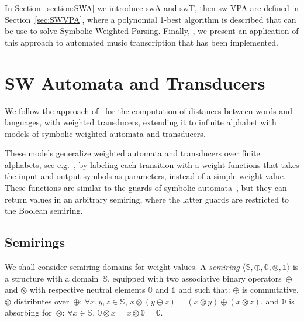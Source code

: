 \documentclass[runningheads]{llncs}
\def\<#1>{\langle #1 \rangle}
\newcommand{\Semiring}{\mathbb{S}}
\newcommand{\zero}{\mathbb{0}}
\newcommand{\one}{\mathbb{1}}
\def\SWT{\textsf{swT}\xspace}
\def\SWA{\textsf{swA}\xspace}
\def\SWVPA{\textsf{sw-VPA}\xspace}
\begin{document}

In Section~\ref{section:SWA} we introduce \SWA and \SWT, 
then \SWVPA are defined in Section~\ref{sec:SWVPA}, 
where a polynomial 1-best algorithm is described that can be use to solve
Symbolic Weighted Parsing.
Finally, \label{sec:transcription}, we present an application 
of this approach to automated music transcription that has been implemented.




\section{SW Automata and Transducers}
\label{section:transducer}
\label{section:SWA}
\label{section:SWT}

We follow the approach of~\cite{Mohri03EDWA} for the computation of distances
between words and languages, with weighted transducers, 
extending it to infinite alphabet with models of symbolic weighted automata 
and transducers. %

These models generalize weighted automata and transducers over finite alphabets, 
see  e.g.~\cite{Mohri03EDWA}, 
by labeling each transition with a weight functions that takes the 
input and output symbols as parameters, instead of a simple weight value.
These functions are similar to the guards of symbolic automata~\cite{dAntoniVeanes17CAV,dAntoni21CACM},
but they can return values in an arbitrary semiring, 
where the latter guards are restricted to the Boolean semiring.


\subsection{Semirings}
\label{section:semiring}
We shall consider semiring domains for weight values.
%
A \emph{semiring} $\< \Semiring, \oplus, \zero, \otimes, \one>$ 
is a structure with a domain~$\Semiring$,
equipped with two associative
binary operators~$\oplus$ and $\otimes$
with respective neutral elements $\zero$ and $\one$ and such that:
$\oplus$ is commutative, 
$\otimes$ distributes over~$\oplus$:  $\forall x, y, z \in \mathbb{S}$,
$x \otimes (y \oplus z) = (x \otimes y) \oplus (x \otimes z)$, 
and $\zero$ is absorbing for~$\otimes$: 
$\forall x\in \mathbb{S}$, $\zero \otimes x = x \otimes \zero = \zero$.
%
\end{document}
